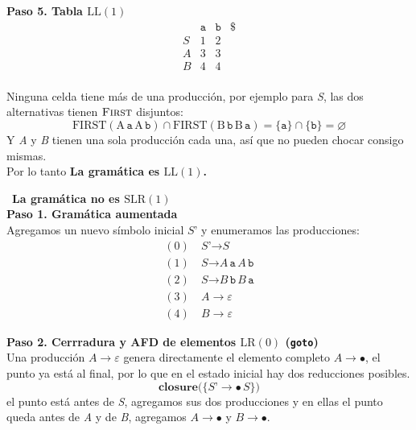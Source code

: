 \documentclass[12pt,letterpaper]{article}
\newcommand{\nt}[1]{\textit{#1}}
\newcommand{\tk}[1]{\texttt{#1}}
\newcommand{\tx}[1]{\text{#1}}
\newcommand{\First}[1]{\mathrm{FIRST}(#1)}
\renewcommand{\ll}{\mathrm{LL(1)}}
\newcommand{\lrc}{\mathrm{LR(0)}}
\newcommand{\slr}{\mathrm{SLR(1)}}
\newcommand{\eps}{\varepsilon}
\begin{document}
\begin{enumerate}[label=\arabic*.]
  \textbf{Paso 5. Tabla $\ll$}
  \[
  \begin{array}{c|c|c|c}
    & \tk{a} & \tk{b} & \tk{\$} \\ \hline
    \nt{S} & 1 & 2 &   \\ \hline
    \nt{A} & 3 & 3 &   \\ \hline
    \nt{B} & 4 & 4 &   \\
  \end{array}
  \]

  Ninguna celda tiene más de una producción, por ejemplo para \nt{S}, las dos alternativas tienen
  $\textsc{First}$ disjuntos:
  \[
  \First{\tx{A}\,\tk{a}\,\tx{A}\,\tk{b}} \cap \First{\tx{B}\,\tk{b}\,\tx{B}\,\tk{a}}
  = \{\tk{a}\} \cap \{\tk{b}\} = \varnothing
  \]
  Y \nt{A} y \nt{B} tienen una sola producción cada una, así que no pueden chocar consigo mismas.\\

  Por lo tanto \textbf{La gramática es $\ll$.}

  \bigskip
  \bigskip
  
  \ \textbf{\large La gramática no es $\slr$}\\

  \textbf{Paso 1. Gramática aumentada}\\
  Agregamos un nuevo símbolo inicial $\nt{S'}$ y enumeramos las producciones:
  \[
  \begin{aligned}
    (0)\ & \nt{S'} \to \nt{S} \\
    (1)\ & \nt{S}  \to \nt{A}\,\tk{a}\,\nt{A}\,\tk{b} \\
    (2)\ & \nt{S}  \to \nt{B}\,\tk{b}\,\nt{B}\,\tk{a} \\
    (3)\ & \nt{A}  \to \eps \\
    (4)\ & \nt{B}  \to \eps
  \end{aligned}
  \]

  \bigskip
  
  \textbf{Paso 2. Cerrradura y AFD de elementos $\lrc$ (\texttt{goto})}\\
  Una producción $\nt{A}\to\eps$ genera directamente el elemento completo $\nt{A}\to\bullet$, el punto ya está al
  final, por lo que en el estado inicial hay dos reducciones posibles.\\
  \[
  \textbf{closure}\big(\{\nt{S'}\to\bullet\,\nt{S}\}\big)
  \]
  el punto está antes de \nt{S}, agregamos sus dos producciones y en ellas el punto queda antes de \nt{A} y de
  \nt{B}, agregamos $\nt{A}\to\bullet$ y $\nt{B}\to\bullet$.


\end{enumerate}
\end{document}
